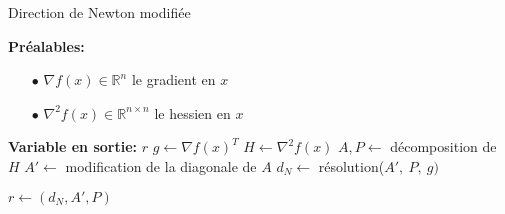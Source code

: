 \begin{algorithm}%
\caption{Direction de Newton modifi\'ee}          %
\label{alg:2}                           %
\begin{algorithmic}  
\STATE \textbf{Pr\'ealables:} %
\begin{itemize}
\item[$\bullet$] $\nabla f(x)\in \mathbb{R}^n$ le gradient en $x$
\item[$\bullet$] $\nabla^2 f(x)\in \mathbb{R}^{n\times n}$ le hessien en $x$
\end{itemize}
\STATE \textbf{Variable en sortie:} $r$
\STATE $g \leftarrow \nabla f(x)^T$
\STATE $H \leftarrow \nabla^2 f(x)$
\STATE $A,P \leftarrow $ d\'ecomposition de $H$
\STATE $A' \leftarrow$ modification de la diagonale de $A$
\STATE $d_N \leftarrow$ r\'esolution($A',\ P,\ g)$ 


\STATE $r\leftarrow (d_N,A',P)$ 
\end{algorithmic}
\end{algorithm}




